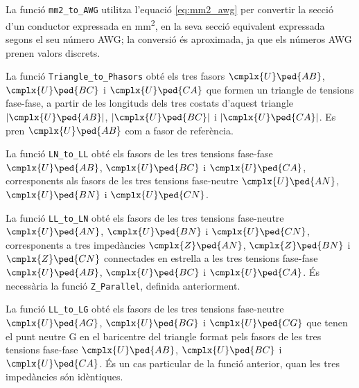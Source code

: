 La funció \texttt{mm2\_to\_AWG} utilitza l'equació \eqref{eq:mm2_awg} per convertir la secció d'un conductor expressada en \unit{mm^2}, en la seva secció equivalent expressada segons el seu número AWG; la conversió és aproximada, ja que els números AWG prenen valors discrets.




La funció \texttt{Triangle\_to\_Phasors} obté els tres fasors $\cmplx{U}\ped{AB}$, $\cmplx{U}\ped{BC}$ i $\cmplx{U}\ped{CA}$ que formen un triangle de tensions fase-fase, a partir de les longituds dels tres costats d'aquest triangle $|\cmplx{U}\ped{AB}|$, $|\cmplx{U}\ped{BC}|$ i $|\cmplx{U}\ped{CA}|$. Es pren $\cmplx{U}\ped{AB}$ com a fasor de referència.




La funció \texttt{LN\_to\_LL} obté els fasors de les tres tensions fase-fase $\cmplx{U}\ped{AB}$, $\cmplx{U}\ped{BC}$ i $\cmplx{U}\ped{CA}$, corresponents als fasors de les tres tensions fase-neutre
$\cmplx{U}\ped{AN}$, $\cmplx{U}\ped{BN}$ i $\cmplx{U}\ped{CN}$.




La funció \texttt{LL\_to\_LN} obté els fasors de les tres tensions fase-neutre $\cmplx{U}\ped{AN}$, $\cmplx{U}\ped{BN}$ i $\cmplx{U}\ped{CN}$, corresponents a tres impedàncies $\cmplx{Z}\ped{AN}$, $\cmplx{Z}\ped{BN}$ i $\cmplx{Z}\ped{CN}$ connectades en estrella a  les tres tensions fase-fase
$\cmplx{U}\ped{AB}$, $\cmplx{U}\ped{BC}$ i $\cmplx{U}\ped{CA}$. És necessària la funció \texttt{Z\_Parallel}, definida anteriorment.




La funció \texttt{LL\_to\_LG} obté els fasors de les tres tensions fase-neutre $\cmplx{U}\ped{AG}$, $\cmplx{U}\ped{BG}$ i $\cmplx{U}\ped{CG}$ que tenen el punt neutre G en el baricentre del triangle format pels fasors de  les tres tensions fase-fase
$\cmplx{U}\ped{AB}$, $\cmplx{U}\ped{BC}$ i $\cmplx{U}\ped{CA}$. És un cas particular de la funció anterior, quan les tres impedàncies són idèntiques.

